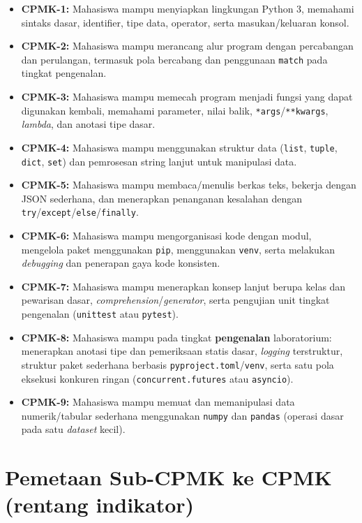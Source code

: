 \documentclass[../main.tex]{subfiles}
\begin{document}
\begin{itemize}[leftmargin=*]
  \item \textbf{CPMK-1:} Mahasiswa mampu menyiapkan lingkungan Python 3, memahami sintaks dasar, identifier, tipe data, operator, serta masukan/keluaran konsol.
  \item \textbf{CPMK-2:} Mahasiswa mampu merancang alur program dengan percabangan dan perulangan, termasuk pola bercabang dan penggunaan \texttt{match} pada tingkat pengenalan.
  \item \textbf{CPMK-3:} Mahasiswa mampu memecah program menjadi fungsi yang dapat digunakan kembali, memahami parameter, nilai balik, \texttt{*args}/\texttt{**kwargs}, \textit{lambda}, dan anotasi tipe dasar.
  \item \textbf{CPMK-4:} Mahasiswa mampu menggunakan struktur data (\texttt{list}, \texttt{tuple}, \texttt{dict}, \texttt{set}) dan pemrosesan string lanjut untuk manipulasi data.
  \item \textbf{CPMK-5:} Mahasiswa mampu membaca/menulis berkas teks, bekerja dengan JSON sederhana, dan menerapkan penanganan kesalahan dengan \texttt{try}/\texttt{except}/\texttt{else}/\texttt{finally}.
  \item \textbf{CPMK-6:} Mahasiswa mampu mengorganisasi kode dengan modul, mengelola paket menggunakan \texttt{pip}, menggunakan \texttt{venv}, serta melakukan \textit{debugging} dan penerapan gaya kode konsisten.
  \item \textbf{CPMK-7:} Mahasiswa mampu menerapkan konsep lanjut berupa kelas dan pewarisan dasar, \textit{comprehension}/\textit{generator}, serta pengujian unit tingkat pengenalan (\texttt{unittest} atau \texttt{pytest}).
  \item \textbf{CPMK-8:} Mahasiswa mampu pada tingkat \textbf{pengenalan} laboratorium: menerapkan anotasi tipe dan pemeriksaan statis dasar, \textit{logging} terstruktur, struktur paket sederhana berbasis \texttt{pyproject.toml}/\texttt{venv}, serta satu pola eksekusi konkuren ringan (\texttt{concurrent.futures} atau \texttt{asyncio}).
  \item \textbf{CPMK-9:} Mahasiswa mampu memuat dan memanipulasi data numerik/tabular sederhana menggunakan \texttt{numpy} dan \texttt{pandas} (operasi dasar pada satu \textit{dataset} kecil).
\end{itemize}

\section{Pemetaan Sub-CPMK ke CPMK (rentang indikator)}
\end{document}
